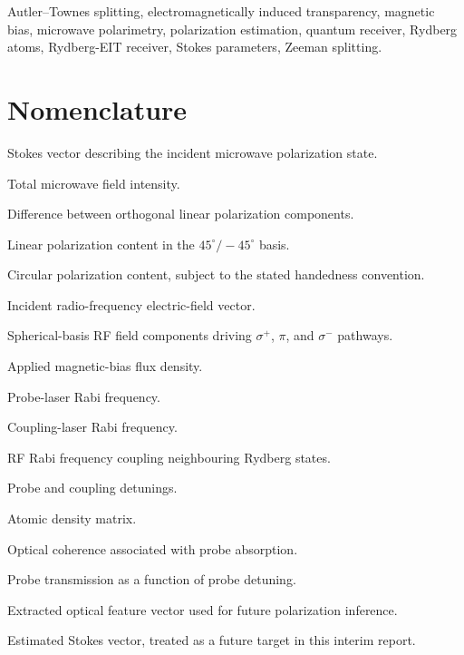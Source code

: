 \documentclass{ieeeaccess}
\begin{document}
\begin{keywords}
Autler--Townes splitting, electromagnetically induced transparency, magnetic bias, microwave polarimetry, polarization estimation, quantum receiver, Rydberg atoms, Rydberg-EIT receiver, Stokes parameters, Zeeman splitting.
\end{keywords}

\titlepgskip=-15pt

\maketitle

\section*{Nomenclature}

\begin{IEEEdescription}

\item[$\mathbf{S}$] Stokes vector describing the incident microwave polarization state.
\item[$S_0$] Total microwave field intensity.
\item[$S_1$] Difference between orthogonal linear polarization components.
\item[$S_2$] Linear polarization content in the \(45^\circ/-45^\circ\) basis.
\item[$S_3$] Circular polarization content, subject to the stated handedness convention.
\item[$\mathbf{E}_{\mathrm{RF}}$] Incident radio-frequency electric-field vector.
\item[$E_{+1},E_0,E_{-1}$] Spherical-basis RF field components driving \(\sigma^+\), \(\pi\), and \(\sigma^-\) pathways.
\item[$B_0$] Applied magnetic-bias flux density.
\item[$\Omega_p$] Probe-laser Rabi frequency.
\item[$\Omega_c$] Coupling-laser Rabi frequency.
\item[$\Omega_{\mathrm{RF}}$] RF Rabi frequency coupling neighbouring Rydberg states.
\item[$\Delta_p,\Delta_c$] Probe and coupling detunings.
\item[$\rho$] Atomic density matrix.
\item[$\rho_{ge}$] Optical coherence associated with probe absorption.
\item[$T(\Delta_p)$] Probe transmission as a function of probe detuning.
\item[$\mathbf{y}$] Extracted optical feature vector used for future polarization inference.
\item[$\widehat{\mathbf{S}}$] Estimated Stokes vector, treated as a future target in this interim report.

\end{IEEEdescription}
\end{document}
